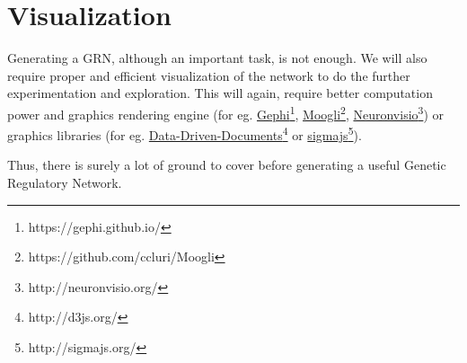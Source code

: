 \documentclass[oneside, a4paper, 11pt]{book}
\begin{document}
\section{Visualization}
Generating a GRN, although an important task, is not enough. We will also require proper and efficient visualization of the network to do the further experimentation and exploration. This will again, require better computation power and graphics rendering engine (for eg. \href{https://gephi.github.io/}{Gephi}\footnote{https://gephi.github.io/}, \href{https://github.com/ccluri/Moogli}{Moogli}\footnote{https://github.com/ccluri/Moogli}, \href{http://neuronvisio.org/}{Neuronvisio}\footnote{http://neuronvisio.org/}) or graphics libraries (for eg. \href{http://d3js.org/}{Data-Driven-Documents}\footnote{http://d3js.org/} or \href{http://sigmajs.org/}{sigmajs}\footnote{http://sigmajs.org/}).
\medskip

Thus, there is surely a lot of ground to cover before generating a useful Genetic Regulatory Network.
\end{document}
